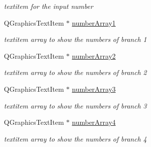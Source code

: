 \begin{DoxyCompactItemize}
\begin{DoxyCompactList}\small\item\em textitem for the input number \end{DoxyCompactList}\item 
\hypertarget{classgamemanager3_a179ed4537498914b9b7df180345eb556}{\-Q\-Graphics\-Text\-Item $\ast$ \hyperlink{classgamemanager3_a179ed4537498914b9b7df180345eb556}{number\-Array1}}\label{classgamemanager3_a179ed4537498914b9b7df180345eb556}

\begin{DoxyCompactList}\small\item\em textitem array to show the numbers of branch 1 \end{DoxyCompactList}\item 
\hypertarget{classgamemanager3_ac4be8d48baf27aec593f2538530b9c80}{\-Q\-Graphics\-Text\-Item $\ast$ \hyperlink{classgamemanager3_ac4be8d48baf27aec593f2538530b9c80}{number\-Array2}}\label{classgamemanager3_ac4be8d48baf27aec593f2538530b9c80}

\begin{DoxyCompactList}\small\item\em textitem array to show the numbers of branch 2 \end{DoxyCompactList}\item 
\hypertarget{classgamemanager3_a07c02f3c47fcc4f2761b11d72bc8250f}{\-Q\-Graphics\-Text\-Item $\ast$ \hyperlink{classgamemanager3_a07c02f3c47fcc4f2761b11d72bc8250f}{number\-Array3}}\label{classgamemanager3_a07c02f3c47fcc4f2761b11d72bc8250f}

\begin{DoxyCompactList}\small\item\em textitem array to show the numbers of branch 3 \end{DoxyCompactList}\item 
\hypertarget{classgamemanager3_a16d46c9049ebaf94c4775da3d8bed9e6}{\-Q\-Graphics\-Text\-Item $\ast$ \hyperlink{classgamemanager3_a16d46c9049ebaf94c4775da3d8bed9e6}{number\-Array4}}\label{classgamemanager3_a16d46c9049ebaf94c4775da3d8bed9e6}

\begin{DoxyCompactList}\small\item\em textitem array to show the numbers of branch 4 \end{DoxyCompactList}\end{DoxyCompactItemize}


